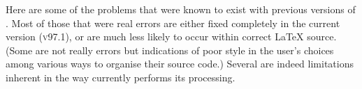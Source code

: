 \internal{}%
\startdocument
%
\tableofchildlinks*\htmlrule{}\html{\\}%
\noindent
Here are some of the problems that were known to exist
with previous versions of \latextohtml. 
Most of those that were real errors are either fixed completely
in the current version (\textsc{v97.1}), or are much less likely to occur
within correct \LaTeX{} source. (Some are not really errors but
indications of poor style in the user's choices among
various ways to organise their source code.)\html{\\} 
Several are indeed limitations inherent in the way 
\latextohtml{} currently performs its processing.
%
